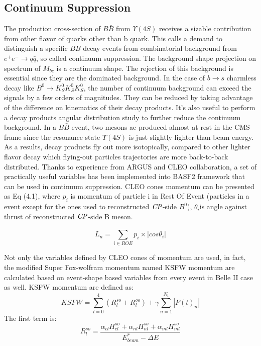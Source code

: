 \subsection{Continuum Suppression}
The production cross-section of $B\bar{B}$ from $\Upsilon{(4S)}$ receives a sizable contribution from other flavor of quarks other than b quark. This calls a demand to distinguish a specific $B\bar{B}$ decay events from combinatorial background from $e^+e^- \to q\bar{q}$, so called continuum suppression. The background shape projection on spectrum of $M_{bc}$ is a continuum shape. The rejection of this background is essential since they are the dominated background.  In the case of $b \to s$ charmless decay like $B^0 \to K_S^0  K_S^0  K_S^0$, the number of continuum background can exceed the signals by a few orders of magnitudes. They can be reduced by taking advantage of the difference on kinematics of their decay products.
It's also useful to perform a decay products angular distribution study to further reduce the continuum background. In a $B\bar{B}$ event, two mesons ae produced almost at rest in the CMS frame since the resonance state $\Upsilon(4S)$ is  just slightly lighter than beam energy. As a results, decay products fly out more isotopically, compared to other lighter flavor decay which  flying-out particles trajectories are more back-to-back distributed. Thanks to experience from ARGUS and CLEO collaboration\cite{Bevan_2014}, a set of practically useful variables has been implemented into BASF2 framework that can be used in continuum suppression. CLEO cones momentum can be presented as Eq (4.1), where $ p_i $ is momentum of particle i in Rest Of Event (particles in a event except for the ones used to reconstructed $\it{CP}$-side $B^0$), $\theta_i$is angle against thrust of reconstructed $\it{CP}$-side B meson.

\begin{equation}
L_n = \sum_{i\in ROE}^{} p_i \times |cos\theta_i|
\end{equation}

Not only the variables defined by  CLEO cones of momentum are used, in fact, the modified Super Fox-wolfram momentum named  KSFW momentum are calculated based on event-shape based variables from every event in Belle II case as well.
KSFW momentum are defined as: 
\begin{equation}
KSFW = \sum_{l=0}^{4}( R_l^{so} + R_l^{oo}) + \gamma \sum_{n=1}^{N_t}|P(t)_n|
\end{equation}
The first term is:
\begin{equation}
R_l^{so} = \frac{\alpha_{cl}H_{cl}^{so} +
				\alpha_{nl}H_{nl}^{so}+
			\alpha_{ml}H_{ml}^{so}}{E^*_{beam}-\Delta E}
\end{equation}

